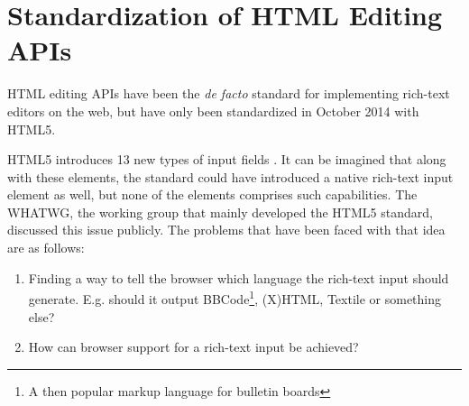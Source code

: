 
\section{Standardization of HTML Editing APIs}
\label{sec:standardization-of-html-editing-apis}





HTML editing APIs have been the \textit{de facto} standard for implementing rich-text editors on the web, but have only been standardized in October 2014 with HTML5. 

HTML5 introduces 13 new types of input fields \cite{HTML5}. It can be imagined that along with these elements, the standard could have introduced a native rich-text input element as well, but none of the elements comprises such capabilities. The WHATWG, the working group that mainly developed the HTML5 standard, discussed this issue publicly. The problems that have been faced with that idea are as follows:


\begin{enumerate} 
\item Finding a way to tell the browser which language the rich-text input should generate. E.g. should it output BBCode\footnote{A then popular markup language for bulletin boards}, (X)HTML, Textile or something else?
\item How can browser support for a rich-text input be achieved?
\end{enumerate}

